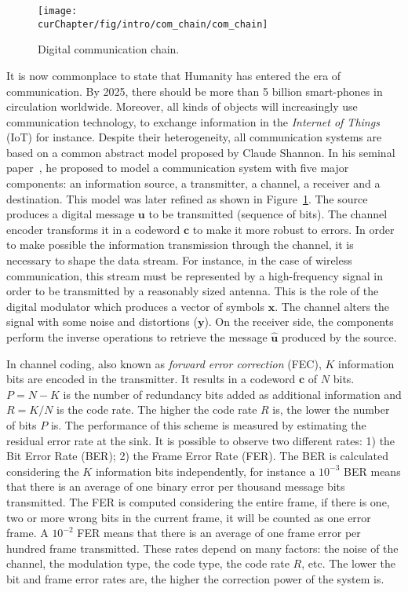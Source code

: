 \begin{figure}[htp]
  \centering
  \texttt{[image: \\curChapter/fig/intro/com\_chain/com\_chain]}
  \caption{Digital communication chain.}
  \label{fig:ctx_com_chain}
\end{figure}

It is now commonplace to state that Humanity has entered the era of
communication. By 2025, there should be more than 5 billion smart-phones in
circulation worldwide. Moreover, all kinds of objects will increasingly use
communication technology, to exchange information in the \emph{Internet of
Things} (IoT) for instance. Despite their heterogeneity, all communication
systems are based on a common abstract model proposed by Claude Shannon. In his
seminal paper~\cite{Shannon1948}, he proposed to model a communication system
with five major components: an information source, a transmitter, a channel, a
receiver and a destination. This model was later refined as shown in
Figure~\ref{fig:ctx_com_chain}. The source produces a digital message $\bm{u}$
to be transmitted (sequence of bits). The channel encoder transforms it in a
codeword $\bm{c}$ to make it more robust to errors. In order to make possible
the information transmission through the channel, it is necessary to shape the
data stream. For instance, in the case of wireless communication, this stream
must be represented by a high-frequency signal in order to be transmitted by a
reasonably sized antenna. This is the role of the digital modulator which
produces a vector of symbols $\bm{x}$. The channel alters the signal with some
noise and distortions ($\bm{y}$). On the receiver side, the components perform
the inverse operations to retrieve the message $\bm{\hat{u}}$ produced by the
source.

In channel coding, also known as \emph{forward error correction} (FEC), $K$
information bits  are encoded in the transmitter. It results in a codeword
$\bm{c}$ of $N$ bits. $P = N - K$ is the number of redundancy bits added as
additional information and $R = K/N$ is the code rate. The higher the code rate
$R$ is, the lower the number of bits $P$ is. The performance of this scheme is
measured by estimating the residual error rate at the sink. It is possible to
observe two different rates: 1) the Bit Error Rate (BER); 2) the Frame Error
Rate (FER). The BER is calculated considering the $K$ information bits
independently, for instance a $10^{-3}$ BER means that there is an average of
one binary error per thousand message bits transmitted. The FER is computed
considering the entire frame, if there is one, two or more wrong bits in the
current frame, it will be counted as one error frame. A $10^{-2}$ FER means that
there is an average of one frame error per hundred frame transmitted. These
rates depend on many factors: the noise of the channel, the modulation
type, the code type, the code rate $R$, etc. The lower the bit and frame error
rates are, the higher the correction power of the system is.

